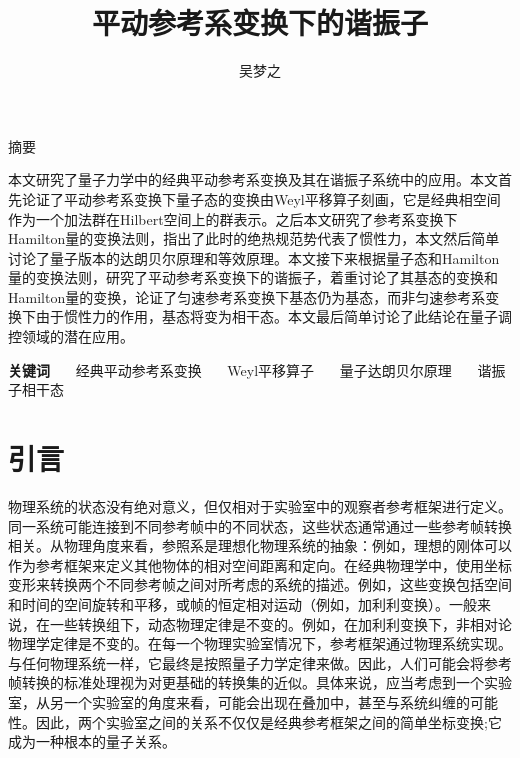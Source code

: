 \documentclass[a4paper]{article}
\title{平动参考系变换下的谐振子}
\author{吴梦之}
\begin{document}
    \maketitle

    \begin{center}
        \fontsize{18pt}{0}摘\quad\quad 要
    \end{center}

        本文研究了量子力学中的经典平动参考系变换及其在谐振子系统中的应用。本文首先论证了平动参考系变换下量子态的变换由Weyl平移算子刻画，它是经典相空间作为一个加法群在Hilbert空间上的群表示。之后本文研究了参考系变换下Hamilton量的变换法则，指出了此时的绝热规范势代表了惯性力，本文然后简单讨论了量子版本的达朗贝尔原理和等效原理。本文接下来根据量子态和Hamilton量的变换法则，研究了平动参考系变换下的谐振子，着重讨论了其基态的变换和Hamilton量的变换，论证了匀速参考系变换下基态仍为基态，而非匀速参考系变换下由于惯性力的作用，基态将变为相干态。本文最后简单讨论了此结论在量子调控领域的潜在应用。

    \textbf{关键词} \ \ \ 经典平动参考系变换 \ \ \ Weyl平移算子 \ \ \ 量子达朗贝尔原理 \ \ \ 谐振子相干态


    \section{引言}

        物理系统的状态没有绝对意义，但仅相对于实验室中的观察者参考框架进行定义。同一系统可能连接到不同参考帧中的不同状态，这些状态通常通过一些参考帧转换相关。从物理角度来看，参照系是理想化物理系统的抽象：例如，理想的刚体可以作为参考框架来定义其他物体的相对空间距离和定向。在经典物理学中，使用坐标变形来转换两个不同参考帧之间对所考虑的系统的描述。例如，这些变换包括空间和时间的空间旋转和平移，或帧的恒定相对运动（例如，加利利变换）。一般来说，在一些转换组下，动态物理定律是不变的。例如，在加利利变换下，非相对论物理学定律是不变的。在每一个物理实验室情况下，参考框架通过物理系统实现。与任何物理系统一样，它最终是按照量子力学定律来做。因此，人们可能会将参考帧转换的标准处理视为对更基础的转换集的近似。具体来说，应当考虑到一个实验室，从另一个实验室的角度来看，可能会出现在叠加中，甚至与系统纠缠的可能性。因此，两个实验室之间的关系不仅仅是经典参考框架之间的简单坐标变换;它成为一种根本的量子关系。
\end{document}
